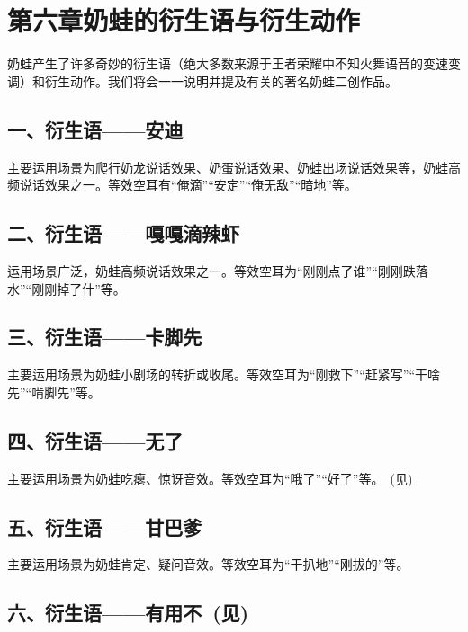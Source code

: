 
\clearpage
\section{第六章\quad 奶蛙的衍生语与衍生动作}

奶蛙产生了许多奇妙的衍生语（绝大多数来源于王者荣耀中不知火舞语音的变速变调）和衍生动作。我们将会一一说明并提及有关的著名奶蛙二创作品。

\subsection{一、衍生语——安迪}

主要运用场景为爬行奶龙说话效果、奶蛋说话效果、奶蛙出场说话效果等，奶蛙高频说话效果之一。等效空耳有“俺滴”“安定”“俺无敌”“暗地”等。

\subsection{二、衍生语——嘎嘎滴辣虾}

运用场景广泛，奶蛙高频说话效果之一。等效空耳为“刚刚点了谁”“刚刚跌落水”“刚刚掉了什”等。

\subsection{三、衍生语——卡脚先}

主要运用场景为奶蛙小剧场的转折或收尾。等效空耳为“刚救下”“赶紧写”“干啥先”“啃脚先”等。

\subsection{四、衍生语——无了}

主要运用场景为奶蛙吃瘪、惊讶音效。等效空耳为“哦了”“好了”等。~(见)



\subsection{五、衍生语——甘巴爹}

主要运用场景为奶蛙肯定、疑问音效。等效空耳为“干扒地”“刚拔的”等。

\subsection[六、衍生语——有用不]{六、衍生语——有用不~(见)}


